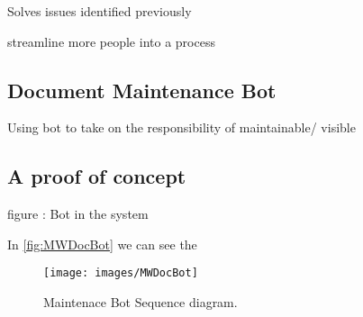 	Solves issues identified previously
 	
 	streamline more people into a process
 	
 	
\subsection{Document Maintenance Bot}
Using bot to take on the responsibility of 
maintainable/ visible


\subsection{A proof of concept}
figure : Bot in the system

In \autoref{fig:MWDocBot}  we can see the 
\begin{figure}[H]
  \centering
  \texttt{[image: images/MWDocBot]}
  \caption[Maintenace Bot Sequence diagram]{Maintenace Bot Sequence diagram.}\label{fig:MWDocBot}
\end{figure}